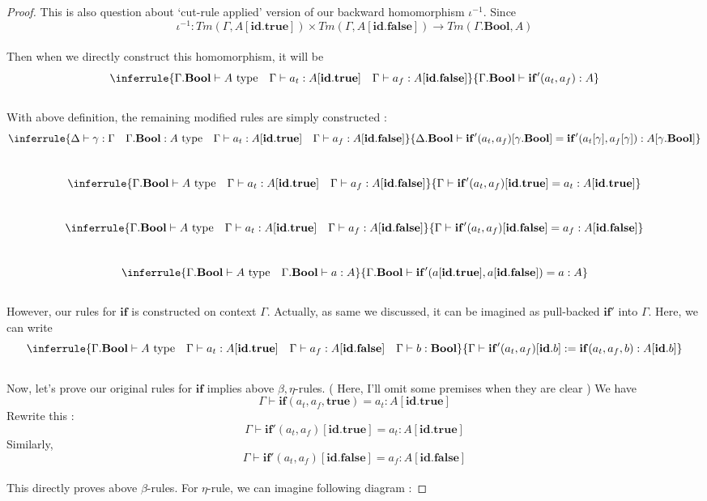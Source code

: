 \documentclass[12pt, letterpaper]{amsart}
\theoremstyle{definition}
\theoremstyle{remark}
\theoremstyle{plain}
\numberwithin{equation}{section}
\begin{document}
\begin{proof}
    
This is also question about \lq cut-rule applied' version of our backward homomorphism $\iota^{-1}$. 
Since 
\[\iota^{-1} : Tm(\Gamma, A[\mathbf{id}.\mathbf{true}]) \times Tm(\Gamma, A[\mathbf{id}.\mathbf{false}]) \rightarrow Tm(\Gamma.\mathbf{Bool}, A) \]
\\
Then when we directly construct this homomorphism, it will be 
\[
\inferrule
{
    \Gamma.\mathbf{Bool} \vdash A \text{ type} \quad \Gamma \vdash a_t : A[\mathbf{id}.\mathbf{true}] \quad \Gamma \vdash a_f : A[\mathbf{id}.\mathbf{false}]
}
{
    \Gamma.\mathbf{Bool} \vdash \mathbf{if}'(a_t, a_f) : A 
}
\]
\\
With above definition, the remaining modified rules are simply constructed : 
\[
\inferrule
{
    \Delta \vdash \gamma : \Gamma \quad \Gamma.\mathbf{Bool} : A \text{ type} \quad \Gamma \vdash a_t : A[\mathbf{id}.\mathbf{true}] \quad \Gamma \vdash a_f : A[\mathbf{id}.\mathbf{false}]
}
{
    \Delta.\mathbf{Bool} \vdash \mathbf{if}'(a_t, a_f)[\gamma.\mathbf{Bool}] = \mathbf{if}'(a_t[\gamma], a_f[\gamma]) : A[\gamma.\mathbf{Bool}]
}
\]
\\
\[
\inferrule
{
    \Gamma.\mathbf{Bool} \vdash A \text{ type} \quad \Gamma \vdash a_t : A[\mathbf{id}.\mathbf{true}] \quad \Gamma \vdash a_f : A[\mathbf{id}.\mathbf{false}]
}
{
    \Gamma \vdash \mathbf{if}'(a_t, a_f)[\mathbf{id}.\mathbf{true}] = a_t : A[\mathbf{id}.\mathbf{true}]
}
\]
\\
\[
\inferrule
{
    \Gamma.\mathbf{Bool} \vdash A \text{ type} \quad \Gamma \vdash a_t : A[\mathbf{id}.\mathbf{true}] \quad \Gamma \vdash a_f : A[\mathbf{id}.\mathbf{false}]
}
{
    \Gamma \vdash \mathbf{if}'(a_t, a_f)[\mathbf{id}.\mathbf{false}] = a_f : A[\mathbf{id}.\mathbf{false}]
}
\]
\\
\[
\inferrule
{
    \Gamma.\mathbf{Bool} \vdash A \text{ type} \quad \Gamma.\mathbf{Bool} \vdash a : A
}
{
    \Gamma.\mathbf{Bool} \vdash \mathbf{if}'(a[\mathbf{id}.\mathbf{true}], a[\mathbf{id}.\mathbf{false}]) = a : A}
\]
\\
However, our rules for $\mathbf{if}$ is constructed on context $\Gamma$. Actually, 
as same we discussed, it can be imagined as pull-backed $\mathbf{if}'$ into $\Gamma$. Here, we can write 
\[
\inferrule
{
    \Gamma.\mathbf{Bool} \vdash A \text{ type} \quad \Gamma \vdash a_t : A[\mathbf{id}.\mathbf{true}] \quad \Gamma \vdash a_f : A[\mathbf{id}.\mathbf{false}] \quad \Gamma \vdash b : \mathbf{Bool}
}
{
    \Gamma \vdash \mathbf{if}'(a_t, a_f)[\mathbf{id}.b] := \mathbf{if}(a_t, a_f, b) : A[\mathbf{id}.b]
}
\]
\\
Now, let's prove our original rules for $\mathbf{if}$ implies above $\beta, \eta$-rules. ( Here, I'll omit some premises when they are clear )
We have 
\[\Gamma \vdash \mathbf{if}(a_t, a_f, \mathbf{true}) = a_t : A[{\mathbf{id.true}}]\]
Rewrite this : 
\[\Gamma \vdash \mathbf{if'}(a_t, a_f)[\mathbf{id.true}] = a_t : A[\mathbf{id.true}]\]
Similarly, 
\[\Gamma \vdash \mathbf{if'}(a_t, a_f)[\mathbf{id.false}] = a_f : A[\mathbf{id.false}]\]
\\
This directly proves above $\beta$-rules. For $\eta$-rule, we can imagine following diagram : 


\end{proof}
\end{document}
